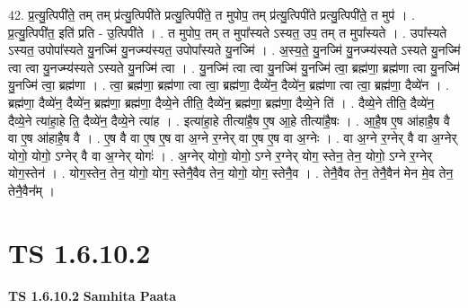 \documentclass[17pt]{extarticle}
\begin{document}
42. प्र॒त्यु॒त्पिपी॑ते॒ तम् तम् प्र॑त्यु॒त्पिपी॑ते प्रत्यु॒त्पिपी॑ते॒ त मुपोप॒ तम् प्र॑त्यु॒त्पिपी॑ते प्रत्यु॒त्पिपी॑ते॒ त मुप॑ । . प्र॒त्यु॒त्पिपी॑त॒ इति॑ प्रति - उ॒त्पिपी॑ते । . त मुपोप॒ तम् त मुपा᳚स्यते ऽस्यत॒ उप॒ तम् त मुपा᳚स्यते । . उपा᳚स्यते ऽस्यत॒ उपोपा᳚स्यते यु॒नज्मि॑ यु॒नज्म्य॑स्यत॒ उपोपा᳚स्यते यु॒नज्मि॑ । . अ॒स्य॒ते॒ यु॒नज्मि॑ यु॒नज्म्य॑स्यते ऽस्यते यु॒नज्मि॑ त्वा त्वा यु॒नज्म्य॑स्यते ऽस्यते यु॒नज्मि॑ त्वा । . यु॒नज्मि॑ त्वा त्वा यु॒नज्मि॑ यु॒नज्मि॑ त्वा॒ ब्रह्म॑णा॒ ब्रह्म॑णा त्वा यु॒नज्मि॑ यु॒नज्मि॑ त्वा॒ ब्रह्म॑णा । . त्वा॒ ब्रह्म॑णा॒ ब्रह्म॑णा त्वा त्वा॒ ब्रह्म॑णा॒ दैव्ये॑न॒ दैव्ये॑न॒ ब्रह्म॑णा त्वा त्वा॒ ब्रह्म॑णा॒ दैव्ये॑न । . ब्रह्म॑णा॒ दैव्ये॑न॒ दैव्ये॑न॒ ब्रह्म॑णा॒ ब्रह्म॑णा॒ दैव्ये॒ने तीति॒ दैव्ये॑न॒ ब्रह्म॑णा॒ ब्रह्म॑णा॒ दैव्ये॒ने ति॑ । . दैव्ये॒ने तीति॒ दैव्ये॑न॒ दैव्ये॒ने त्या॑हा॒हे ति॒ दैव्ये॑न॒ दैव्ये॒ने त्या॑ह । . इत्या॑हा॒हे तीत्या॑है॒ष ए॒ष आ॒हे तीत्या॑है॒षः । . आ॒है॒ष ए॒ष आ॑हाहै॒ष वै वा ए॒ष आ॑हाहै॒ष वै । . ए॒ष वै वा ए॒ष ए॒ष वा अ॒ग्ने र॒ग्नेर् वा ए॒ष ए॒ष वा अ॒ग्नेः । . वा अ॒ग्ने र॒ग्नेर् वै वा अ॒ग्नेर् योगो॒ योगो॒ ऽग्नेर् वै वा अ॒ग्नेर् योगः॑ । . अ॒ग्नेर् योगो॒ योगो॒ ऽग्ने र॒ग्नेर् योग॒ स्तेन॒ तेन॒ योगो॒ ऽग्ने र॒ग्नेर् योग॒स्तेन॑ । . योग॒स्तेन॒ तेन॒ योगो॒ योग॒ स्तेनै॒वैव तेन॒ योगो॒ योग॒ स्तेनै॒व । . तेनै॒वैव तेन॒ तेनै॒वैन॑ मेन मे॒व तेन॒ तेनै॒वैन᳚म् । \newline
\pagebreak
{}
\section*{ TS 1.6.10.2 }

\textbf{TS 1.6.10.2 } \newline
\textbf{Samhita Paata} \newline
\end{document}
